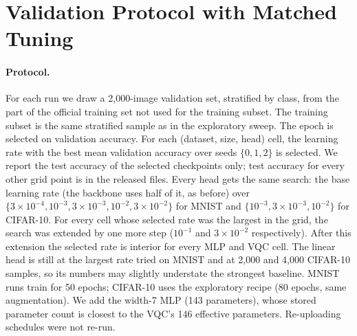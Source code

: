 \documentclass[10pt]{article}
\begin{document}
\section{Validation Protocol with Matched Tuning}
\label{sec:protocol}

\paragraph{Protocol.}
For each run we draw a 2{,}000-image validation set, stratified by class, from
the part of the official training set not used for the training subset. The
training subset is the same stratified sample as in the exploratory sweep. The
epoch is selected on validation accuracy. For each (dataset, size, head) cell,
the learning rate with the best mean validation accuracy over seeds
$\{0,1,2\}$ is selected. We report the test accuracy of the selected
checkpoints only; test accuracy for every other grid point is in the released
files. Every head gets the same search: the base learning rate (the backbone
uses half of it, as before) over $\{3\times10^{-4}, 10^{-3}, 3\times10^{-3},
10^{-2}, 3\times10^{-2}\}$ for MNIST and $\{10^{-3}, 3\times10^{-3},
10^{-2}\}$ for CIFAR-10. For every cell whose selected rate was the largest in
the grid, the search was extended by one more step ($10^{-1}$ and
$3\times10^{-2}$ respectively). After this extension the selected rate is
interior for every MLP and VQC cell. The linear head is still at the largest
rate tried on MNIST and at 2{,}000 and 4{,}000 CIFAR-10 samples, so its numbers
may slightly understate the strongest baseline. MNIST runs train for 50 epochs;
CIFAR-10 uses the exploratory recipe (80 epochs, same augmentation). We add the
width-7 MLP (143 parameters), whose stored parameter count is closest to the
VQC's 146 effective parameters. Re-uploading schedules were not re-run.
\end{document}
